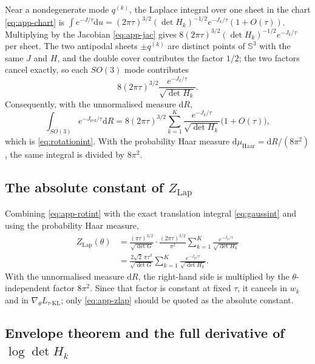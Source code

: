 Near a nondegenerate mode $q^{(k)}$, the Laplace integral over one sheet in the chart \eqref{eq:app-chart} is $\int e^{-J/\tau}\mathrm{d}u=(2\pi\tau)^{3/2}(\det H_k)^{-1/2}e^{-J_k/\tau}(1+O(\tau))$. Multiplying by the Jacobian \eqref{eq:app-jac} gives $8(2\pi\tau)^{3/2}(\det H_k)^{-1/2}e^{-J_k/\tau}$ per sheet. The two antipodal sheets $\pm q^{(k)}$ are distinct points of $\mathbb{S}^3$ with the same $J$ and $H$, and the double cover contributes the factor $1/2$; the two factors cancel exactly, so each $SO(3)$ mode contributes
\begin{equation}
8(2\pi\tau)^{3/2}\frac{e^{-J_k/\tau}}{\sqrt{\det H_k}} .
\label{eq:app-permode}
\end{equation}
Consequently, with the unnormalised measure $\mathrm{d}R$,
\begin{equation}
\int_{SO(3)}e^{-J_{\mathrm{red}}/\tau}\mathrm{d}R
=8(2\pi\tau)^{3/2}\sum_{k=1}^K\frac{e^{-J_k/\tau}}{\sqrt{\det H_k}}\big(1+O(\tau)\big),
\label{eq:app-rotint}
\end{equation}
which is \eqref{eq:rotationint}. With the probability Haar measure $\mathrm{d}\mu_{\mathrm{Haar}}=\mathrm{d}R/(8\pi^2)$, the same integral is divided by $8\pi^2$.

\subsection*{The absolute constant of \texorpdfstring{$Z_{\mathrm{Lap}}$}{Z\_Lap}}

Combining \eqref{eq:app-rotint} with the exact translation integral \eqref{eq:gaussint} and using the probability Haar measure,
\begin{equation}
\begin{split}
Z_{\mathrm{Lap}}(\theta)&=\frac{(\pi\tau)^{3/2}}{\sqrt{\det G}}\cdot\frac{(2\pi\tau)^{3/2}}{\pi^2}\sum_{k=1}^K\frac{e^{-J_k/\tau}}{\sqrt{\det H_k}}\\
&=\frac{2\sqrt2\,\pi\tau^3}{\sqrt{\det G}}\sum_{k=1}^K\frac{e^{-J_k/\tau}}{\sqrt{\det H_k}} .
\end{split}
\label{eq:app-zlap}
\end{equation}
With the unnormalised measure $\mathrm{d}R$, the right-hand side is multiplied by the $\theta$-independent factor $8\pi^2$. Since that factor is constant at fixed $\tau$, it cancels in $w_k$ and in $\nabla_\theta L_{\tau\text{-KL}}$; only \eqref{eq:app-zlap} should be quoted as the absolute constant.

\subsection*{Envelope theorem and the full derivative of \texorpdfstring{$\log\det H_k$}{log det H\_k}}

